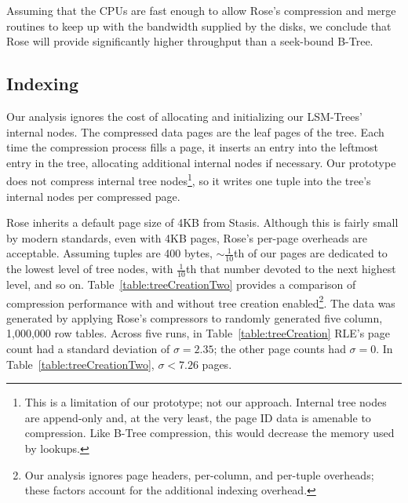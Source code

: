 \documentclass{vldb}
\newcommand{\rows}{Rose\xspace}
\newcommand{\rowss}{Rose's\xspace}
\begin{document}
Assuming that the CPUs are fast enough to allow \rowss
compression and merge routines to keep up with the bandwidth supplied
by the disks, we conclude that \rows will provide significantly higher
throughput than a seek-bound B-Tree.

\subsection{Indexing}

Our analysis ignores the cost of allocating and initializing our
LSM-Trees' internal nodes.  The compressed data pages are the leaf
pages of the tree.  Each time the compression process fills a page, it
inserts an entry into the leftmost entry in the tree, allocating
additional internal nodes if necessary.  Our prototype does not compress
internal tree nodes\footnote{This is a limitation of our prototype;
  not our approach.  Internal tree nodes are append-only and, at the
  very least, the page ID data is amenable to compression. Like B-Tree
  compression, this would decrease the memory used by lookups.},
so it writes one tuple into the tree's internal nodes per compressed
page.

\rows inherits a default page size of 4KB from Stasis.
Although this is fairly small by modern standards, even with
4KB pages, \rowss per-page overheads are acceptable.  Assuming tuples
are 400 bytes, $\sim\frac{1}{10}$th of our pages are dedicated to the
lowest level of tree nodes, with $\frac{1}{10}$th that number devoted
to the next highest level, and so on.
Table~\ref{table:treeCreationTwo} provides a comparison of compression
performance with and without tree creation enabled\footnote{Our
  analysis ignores page headers, per-column, and per-tuple overheads;
  these factors account for the additional indexing overhead.}.  The
data was generated by applying \rowss compressors to randomly
generated five column, 1,000,000 row tables.  Across five runs, in
Table~\ref{table:treeCreation} RLE's page count had a standard
deviation of $\sigma=2.35$; the other page counts had $\sigma=0$.  In
Table~\ref{table:treeCreationTwo}, $\sigma < 7.26$ pages.

\end{document}
